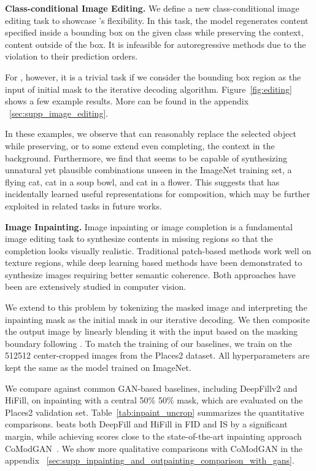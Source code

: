 \noindent\textbf{Class-conditional Image Editing.}
We define a new class-conditional image editing task to showcase \model's flexibility. In this task, the model regenerates content specified inside a bounding box on the given class while preserving the context, \ie content outside of the box. It is infeasible for autoregressive methods due to the violation to their prediction orders.

For \model, however, it is a trivial task if we consider the bounding box region as the input of initial mask to the iterative decoding algorithm. Figure~\ref{fig:editing} shows a few example results. More can be found in the appendix ~\ref{sec:supp_image_editing}.

In these examples, we observe that \model can reasonably replace the selected object while preserving, or to some extend even completing, the context in the background. Furthermore, we find that \model seems to be capable of synthesizing unnatural yet plausible combinations unseen in the ImageNet training set, \eg a flying cat, cat in a soup bowl, and cat in a flower. This suggests that \model has incidentally learned useful representations for composition, which may be further exploited in related tasks in future works.

\vspace{2mm}
\noindent\textbf{Image Inpainting.}
\label{ssec:inpainting}
Image inpainting or image completion is a fundamental image editing task to synthesize contents in missing regions so that the completion looks visually realistic. Traditional patch-based methods\cite{Barnes:2009:patchmatch} work well on texture regions, while deep learning based methods\cite{yu2019free, yi2020contextual, zhao2021comodgan, saharia2021palette, esser2021imagebart} have been demonstrated to synthesize images requiring better semantic coherence. Both approaches have been are extensively studied in computer vision.

We extend \model to this problem by tokenizing the masked image and interpreting the inpainting mask as the initial mask in our iterative decoding. We then composite the output image by linearly blending it with the input based on the masking boundary following \cite{cheng2021inout}.
To match the training of our baselines, we train \model on the 512512 center-cropped images from the Places2\cite{zhou2017places} dataset. All hyperparameters are kept the same as the \model model trained on ImageNet.

We compare \model against common GAN-based baselines, including DeepFillv2\cite{yu2019free} and HiFill\cite{yi2020contextual}, on inpainting with a central 50\%  50\% mask, which are evaluated on the Places2 validation set. Table~\ref{tab:inpaint_uncrop} summarizes the quantitative comparisons. \model beats both DeepFill and HiFill in FID and IS by a significant margin, while achieving scores close to the state-of-the-art inpainting approach CoModGAN~\cite{zhao2021comodgan}. We show more qualitative comparisons with CoModGAN in the appendix ~\ref{sec:supp_inpainting_and_outpainting_comparison_with_gans}.



